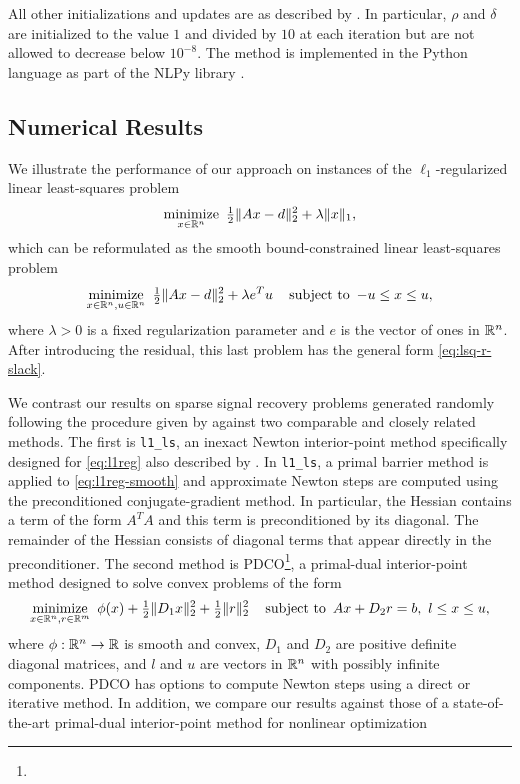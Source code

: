 \documentclass{amsart}
\begin{document}
All other initializations and updates are as described by
\cite{friedlander-orban-2012}. In particular, $\rho$ and $\delta$ are
initialized to the value $1$ and divided by $10$ at each iteration but are not
allowed to decrease below $10^{-8}$. The method is implemented in the Python
language as part of the \textsf{NLPy} library \citep{orban-2012}.

\subsection{Numerical Results}

We illustrate the performance of our approach on instances of the
$\ell_1$-regularized linear least-squares problem
\begin{equation}
  \label{eq:l1reg}
  \displaystyle\mathop{\textup{minimize}}_{x \in \mathbb{R}^n} \ \tfrac{1}{2} \|Ax - d\|_2^2 + \lambda \|x\|_1,
\end{equation}
which can be reformulated as the smooth bound-constrained linear least-squares
problem
\begin{equation}
  \label{eq:l1reg-smooth}
  \displaystyle\mathop{\textup{minimize}}_{x \in \mathbb{R}^n, u \in \mathbb{R}^n} \ \tfrac{1}{2} \|Ax - d\|_2^2 + \lambda e^T u
  \quad
  \mathop{\textup{subject to}} \ -u \leq x \leq u,
\end{equation}
where $\lambda > 0$ is a fixed regularization parameter and $e$ is the vector
of ones in $\mathbb{R}^n$. After introducing the residual, this last problem has the
general form \eqref{eq:lsq-r-slack}.

We contrast our results on sparse signal recovery problems generated randomly
following the procedure given by \cite{kim-koh-lustig-boyd-gorinevsky-2007}
against two comparable and closely related methods. The first is
\texttt{l1\_ls}, an inexact Newton interior-point method specifically designed
for \eqref{eq:l1reg} also described by
\cite{kim-koh-lustig-boyd-gorinevsky-2007}. In \texttt{l1\_ls}, a primal
barrier method is applied to \eqref{eq:l1reg-smooth} and approximate Newton
steps are computed using the preconditioned conjugate-gradient method. In
particular, the Hessian contains a term of the form $A^T A$ and this term is
preconditioned by its diagonal. The remainder of the Hessian consists of
diagonal terms that appear directly in the preconditioner. The second method
is PDCO\footnote{}, a
primal-dual interior-point method designed to solve convex problems of the
form
\begin{equation}
  \label{eq:prob-pdco}
  \displaystyle\mathop{\textup{minimize}}_{x \in \mathbb{R}^n, r \in \mathbb{R}^m} \
  \phi(x) + \tfrac{1}{2} \|D_1 x\|^2_2 + \tfrac{1}{2} \|r\|_2^2
  \quad
  \mathop{\textup{subject to}} \ Ax + D_2 r = b, \ l \leq x \leq u,
\end{equation}
where $\phi: \mathbb{R}^n \to \mathbb{R}$ is smooth and convex, $D_1$ and $D_2$ are positive
definite diagonal matrices, and $l$ and $u$ are vectors in $\mathbb{R}^n$ with
possibly infinite components. PDCO has options to compute Newton steps using a
direct or iterative method. In addition, we compare our results against those of a state-of-the-art primal-dual interior-point method for nonlinear optimization
\end{document}
